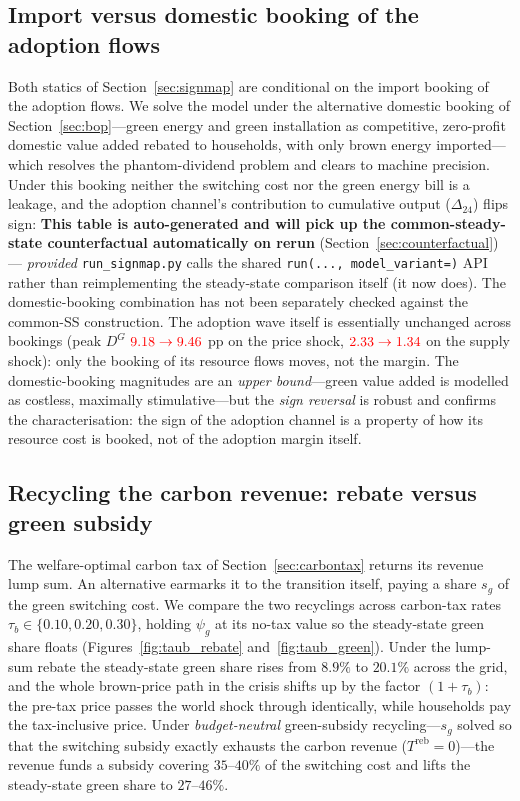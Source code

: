\documentclass[11pt,a4paper]{article}
\newcommand{\NEEDSRERUN}[1]{\textcolor{red}{#1}}
\begin{document}
\subsection{Import versus domestic booking of the adoption flows}\label{app:booking_flows}
Both statics of Section~\ref{sec:signmap} are conditional on the import booking of the
adoption flows. We solve the model under the alternative domestic booking of
Section~\ref{sec:bop}---green energy and green installation as competitive,
zero-profit domestic value added rebated to households, with only brown energy
imported---which resolves the phantom-dividend problem and clears to machine
precision. Under this booking neither the switching cost nor the green energy
bill is a leakage, and the adoption channel's contribution to cumulative output
($\Delta_{24}$) flips sign:
\textbf{This table is auto-generated and will pick up the common-steady-state
counterfactual automatically on rerun} (Section~\ref{sec:counterfactual}) ---
\emph{provided} \texttt{run\_signmap.py} calls the shared \texttt{run(...,
model\_variant=)} API rather than reimplementing the steady-state comparison
itself (it now does). The domestic-booking combination has not been separately
checked against the common-SS construction.
The adoption wave itself is essentially unchanged across bookings (peak $D^{G}$
$\NEEDSRERUN{9.18\to9.46}$ pp on the price shock, $\NEEDSRERUN{2.33\to1.34}$ on the supply shock): only
the booking of its resource flows moves, not the margin. The domestic-booking
magnitudes are an \emph{upper bound}---green value added is modelled as costless,
maximally stimulative---but the \emph{sign reversal} is robust and confirms the
characterisation: the sign of the adoption channel is a property of how its
resource cost is booked, not of the adoption margin itself.

\subsection{Recycling the carbon revenue: rebate versus green subsidy}
\label{sec:recycle}

The welfare-optimal carbon tax of Section~\ref{sec:carbontax} returns its
revenue lump sum. An alternative earmarks it to the transition itself, paying a
share $s_g$ of the green switching cost. We compare the two recyclings across
carbon-tax rates $\tau_b\in\{0.10,0.20,0.30\}$, holding $\psi_g$ at its no-tax
value so the steady-state green share floats (Figures~\ref{fig:taub_rebate}
and~\ref{fig:taub_green}). Under the lump-sum rebate the steady-state green
share rises from $8.9\%$ to $20.1\%$ across the grid, and the whole brown-price
path in the crisis shifts up by the factor $(1+\tau_b)$: the pre-tax price
passes the world shock through identically, while households pay the
tax-inclusive price. Under \emph{budget-neutral} green-subsidy recycling---$s_g$
solved so that the switching subsidy exactly exhausts the carbon revenue
($T^{\mathrm{reb}}=0$)---the revenue funds a subsidy covering $35$--$40\%$ of
the switching cost and lifts the steady-state green share to $27$--$46\%$.
\end{document}
